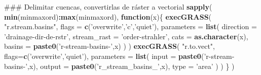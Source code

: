 \documentclass[11pt,]{article}
\newenvironment{Shaded}{\begin{snugshade}}{\end{snugshade}}
\newcommand{\KeywordTok}[1]{\textcolor[rgb]{0.13,0.29,0.53}{\textbf{#1}}}
\newcommand{\DataTypeTok}[1]{\textcolor[rgb]{0.13,0.29,0.53}{#1}}
\newcommand{\StringTok}[1]{\textcolor[rgb]{0.31,0.60,0.02}{#1}}
\newcommand{\ControlFlowTok}[1]{\textcolor[rgb]{0.13,0.29,0.53}{\textbf{#1}}}
\newcommand{\OperatorTok}[1]{\textcolor[rgb]{0.81,0.36,0.00}{\textbf{#1}}}
\newcommand{\NormalTok}[1]{#1}
\begin{document}
\begin{Shaded}
\begin{Highlighting}[]
{{{{{{{{\NormalTok{### Delimitar cuencas, convertirlas de ráster a vectorial}
\KeywordTok{sapply}\NormalTok{(}
  \KeywordTok{min}\NormalTok{(minmaxord)}\OperatorTok{:}\KeywordTok{max}\NormalTok{(minmaxord),}
  \ControlFlowTok{function}\NormalTok{(x)\{}
    \KeywordTok{execGRASS}\NormalTok{(}
      \StringTok{"r.stream.basins"}\NormalTok{,}
      \DataTypeTok{flags =} \KeywordTok{c}\NormalTok{(}\StringTok{'overwrite'}\NormalTok{,}\StringTok{'c'}\NormalTok{,}\StringTok{'quiet'}\NormalTok{),}
      \DataTypeTok{parameters =} \KeywordTok{list}\NormalTok{(}
        \DataTypeTok{direction =} \StringTok{'drainage-dir-de-rstr'}\NormalTok{,}
        \DataTypeTok{stream_rast =} \StringTok{'order-strahler'}\NormalTok{,}
        \DataTypeTok{cats =} \KeywordTok{as.character}\NormalTok{(x),}
        \DataTypeTok{basins =} \KeywordTok{paste0}\NormalTok{(}\StringTok{'r-stream-basins-'}\NormalTok{,x)}
\NormalTok{      )}
\NormalTok{    )}
    \KeywordTok{execGRASS}\NormalTok{(}
      \StringTok{"r.to.vect"}\NormalTok{,}
      \DataTypeTok{flags=}\KeywordTok{c}\NormalTok{(}\StringTok{'overwrite'}\NormalTok{,}\StringTok{'quiet'}\NormalTok{),}
      \DataTypeTok{parameters =} \KeywordTok{list}\NormalTok{(}
        \DataTypeTok{input =} \KeywordTok{paste0}\NormalTok{(}\StringTok{'r-stream-basins-'}\NormalTok{,x),}
        \DataTypeTok{output =} \KeywordTok{paste0}\NormalTok{(}\StringTok{'r_stream_basins_'}\NormalTok{,x),}
        \DataTypeTok{type =} \StringTok{'area'}
\NormalTok{      )}
\NormalTok{    )}
\NormalTok{  \}}
\NormalTok{)}

}}}}}}}}
\end{Highlighting}
\end{Shaded}
\end{document}
